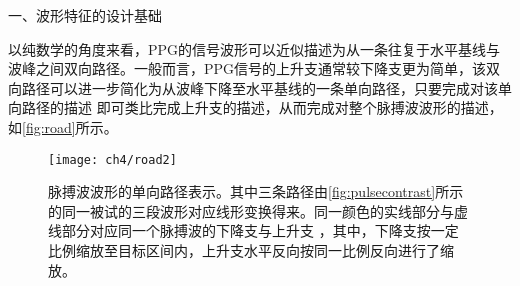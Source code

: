 一、波形特征的设计基础

以纯数学的角度来看，PPG的信号波形可以近似描述为从一条往复于水平基线与波峰之间双向路径。一般而言，PPG信号的上升支通常较下降支更为简单，该双向路径可以进一步简化为从波峰下降至水平基线的一条单向路径，只要完成对该单向路径的描述
即可类比完成上升支的描述，从而完成对整个脉搏波波形的描述，如\autoref{fig:road}所示。
\begin{figure}[htbp]
    \centering
    \texttt{[image: ch4/road2]}
    \caption[脉搏波波形的单向路径表示]{\label{fig:road}脉搏波波形的单向路径表示。其中三条路径由\autoref{fig:pulsecontrast}所示的同一被试的三段波形对应线形变换得来。同一颜色的实线部分与虚线部分对应同一个脉搏波的下降支与上升支
    ，其中，下降支按一定比例缩放至目标区间内，上升支水平反向按同一比例反向进行了缩放。}
\end{figure}

